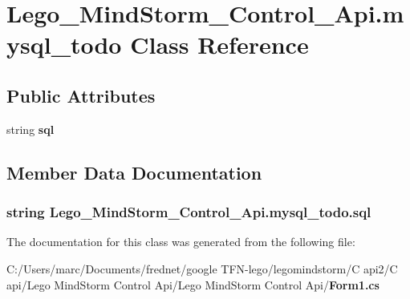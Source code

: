 \section{Lego\_\-MindStorm\_\-Control\_\-Api.mysql\_\-todo Class Reference}
\label{class_lego___mind_storm___control___api_1_1mysql__todo}
\subsection*{Public Attributes}
\begin{CompactItemize}
\item 
string {\bf sql}
\end{CompactItemize}


\subsection{Member Data Documentation}
\subsubsection[{sql}]{\setlength{\rightskip}{0pt plus 5cm}string {\bf Lego\_\-MindStorm\_\-Control\_\-Api.mysql\_\-todo.sql}}\label{class_lego___mind_storm___control___api_1_1mysql__todo_a21b577fe501389b703a650953d6fae6}




The documentation for this class was generated from the following file:\begin{CompactItemize}
\item 
C:/Users/marc/Documents/frednet/google TFN-lego/legomindstorm/C api2/C api/Lego MindStorm Control Api/Lego MindStorm Control Api/{\bf Form1.cs}\end{CompactItemize}
